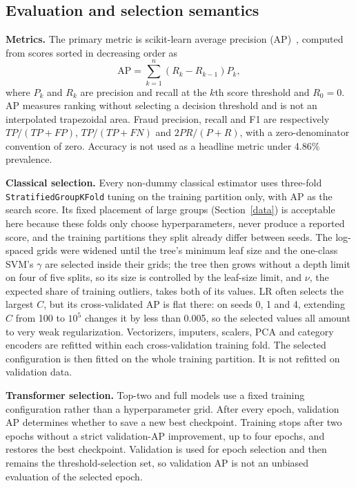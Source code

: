 \subsection{Evaluation and selection semantics}

\textbf{Metrics.} The primary metric is scikit-learn average precision (AP)~\cite{sklearn_ap}, computed from scores
sorted in decreasing order as
\begin{equation}
\mathrm{AP}=\sum_{k=1}^{n}(R_k-R_{k-1})P_k,
\end{equation}
where $P_k$ and $R_k$ are precision and recall at the $k$th score threshold and $R_0=0$. AP measures
ranking without selecting a decision threshold and is not an interpolated trapezoidal area. Fraud
precision, recall and F1 are respectively $TP/(TP+FP)$, $TP/(TP+FN)$ and $2PR/(P+R)$, with a
zero-denominator convention of zero. Accuracy is not used as a headline metric under 4.86\%
prevalence.

\textbf{Classical selection.} Every non-dummy classical estimator uses three-fold
\texttt{StratifiedGroupKFold} tuning on the training partition only, with AP as the search score. Its fixed placement of large
groups (Section~\ref{data}) is acceptable here because these folds only choose hyperparameters, never
produce a reported score, and the training partitions they split already differ between seeds. The log-spaced grids were widened until the tree's minimum leaf size and the one-class SVM's
$\gamma$ are selected inside their grids; the tree then grows without a depth limit on four of five
splits, so its size is controlled by the leaf-size limit, and $\nu$, the expected share of training
outliers, takes both of its values. LR
often selects the largest $C$, but its cross-validated AP is flat there: on seeds 0, 1 and 4,
extending $C$ from 100 to $10^5$ changes it by less than 0.005, so the selected values all amount to
very weak regularization.
Vectorizers, imputers, scalers, PCA and category encoders are refitted within each cross-validation
training fold. The selected configuration is then fitted on the whole training partition. It is not
refitted on validation data.

\textbf{Transformer selection.} Top-two and full models use a fixed training configuration rather
than a hyperparameter grid. After every epoch, validation AP determines whether to save a new best
checkpoint. Training stops after two epochs without a strict validation-AP improvement, up to four
epochs, and restores the best checkpoint. Validation is used for epoch selection and then remains
the threshold-selection set, so validation AP is not an unbiased evaluation of the selected epoch.

